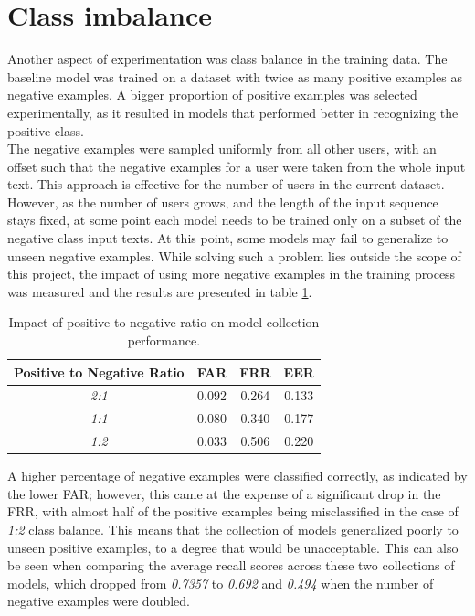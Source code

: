 \section{Class imbalance}
Another aspect of experimentation was class balance in the training data. The baseline model was trained on a dataset with twice as many positive examples as negative examples. A bigger proportion of positive examples was selected experimentally, as it resulted in models that performed better in recognizing the positive class. \\ 
The negative examples were sampled uniformly from all other users, with an offset such that the negative examples for a user were taken from the whole input text. This approach is effective for the number of users in the current dataset. However, as the number of users grows, and the length of the input sequence stays fixed, at some point each model needs to be trained only on a subset of the negative class input texts. At this point, some models may fail to generalize to unseen negative examples. 
While solving such a problem lies outside the scope of this project, the impact of using more negative examples in the training process was measured and the results are presented in table \ref{table:egde_encoding_comp}.


\begin{center}
	\begin{table}[H]
		\begin{center}
			\begin{tabular}{ |c|c|c|c| } 
				\hline
				Positive to Negative Ratio & FAR & FRR & EER \\
				\hline
				\textit{2:1} & 0.092 & 0.264 & 0.133 \\
				\hline
				\textit{1:1} & 0.080 & 0.340 & 0.177 \\
				\hline
				\textit{1:2} & 0.033 & 0.506 & 0.220 \\
				\hline
			\end{tabular}
		\end{center}
		\caption{Impact of positive to negative ratio on model collection performance.}
		\label{table:egde_encoding_comp}
	\end{table}
\end{center}

A higher percentage of negative examples were classified correctly, as indicated by the lower FAR; however, this came at the expense of a significant drop in the FRR, with almost half of the positive examples being misclassified in the case of \textit{1:2} class balance. This means that the collection of models generalized poorly to unseen positive examples, to a degree that would be unacceptable. This can also be seen when comparing the average recall scores across these two collections of models, which dropped from \textit{0.7357} to \textit{0.692} and \textit{0.494} when the number of negative examples were doubled. 

